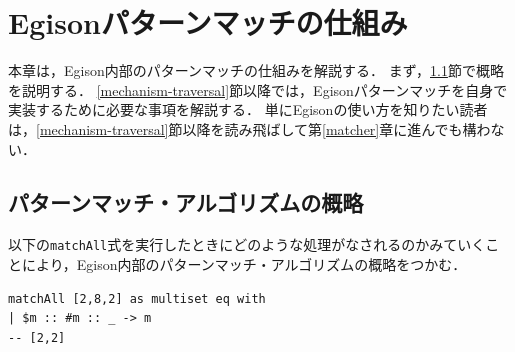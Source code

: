 \chapter{Egisonパターンマッチの仕組み}\label{mechanism}

本章は，Egison内部のパターンマッチの仕組みを解説する．
まず，\ref{mechanism-overview}節で概略を説明する．
\ref{mechanism-traversal}節以降では，Egisonパターンマッチを自身で実装するために必要な事項を解説する．
単にEgisonの使い方を知りたい読者は，\ref{mechanism-traversal}節以降を読み飛ばして第\ref{matcher}章に進んでも構わない．

\section{パターンマッチ・アルゴリズムの概略}\label{mechanism-overview}

以下の\lstinline{matchAll}式を実行したときにどのような処理がなされるのかみていくことにより，Egison内部のパターンマッチ・アルゴリズムの概略をつかむ．
\begin{lstlisting}[language=egison,numbers=none]
matchAll [2,8,2] as multiset eq with
| $m :: #m :: _ -> m
-- [2,2]
\end{lstlisting}

